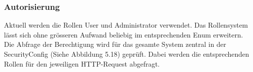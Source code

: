 \subsubsection{Autorisierung}
Aktuell werden die Rollen User und Administrator verwendet.
Das Rollensystem lässt sich ohne grösseren Aufwand beliebig im entsprechenden Enum erweitern.
Die Abfrage der Berechtigung wird für das gesamte System zentral in der SecurityConfig (Siehe Abbildung 5.18) geprüft.
Dabei werden die entsprechenden Rollen für den jeweiligen HTTP-Request abgefragt.


\clearpage

